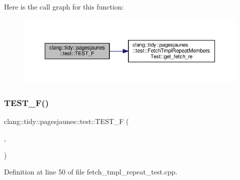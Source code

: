 Here is the call graph for this function\+:
\nopagebreak
\begin{figure}[H]
\begin{center}
\leavevmode
\includegraphics[width=350pt]{namespaceclang_1_1tidy_1_1pagesjaunes_1_1test_a68dff4d1bdbff04447e8cc4668b2c01f_cgraph}
\end{center}
\end{figure}
\mbox{\label{namespaceclang_1_1tidy_1_1pagesjaunes_1_1test_ae224f8294c705315456c4a87a2a71a84}} 
\subsubsection{\texorpdfstring{T\+E\+S\+T\+\_\+\+F()}{TEST\_F()}\hspace{0.1cm}{\footnotesize\ttfamily [10/57]}}
{\footnotesize\ttfamily clang\+::tidy\+::pagesjaunes\+::test\+::\+T\+E\+S\+T\+\_\+F (\begin{DoxyParamCaption}\item[{\hyperlink{classclang_1_1tidy_1_1pagesjaunes_1_1test_1_1_fetch_tmpl_repeat_test}{Fetch\+Tmpl\+Repeat\+Test}}]{,  }\item[{Templ\+Repeat\+Regex\+Matching}]{ }\end{DoxyParamCaption})}



Definition at line 50 of file fetch\+\_\+tmpl\+\_\+repeat\+\_\+test.\+cpp.

